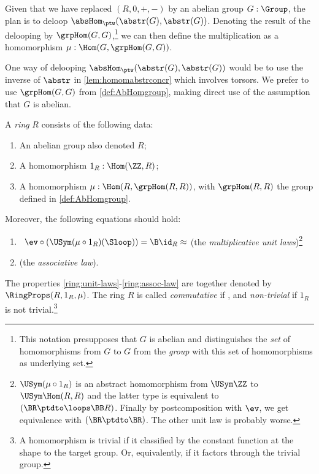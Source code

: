Given that we have replaced $(R,0,+,-)$ by an abelian group $G:\Group$,
the plan is to deloop $\absHom_{\ptw}(\abstr(G),\abstr(G))$. 
Denoting the result of the delooping by $\grpHom(G,G)$,\footnote{%
This notation presupposes that $G$ is abelian and distinguishes 
the \emph{set} of homomorphisms from $G$ to $G$ from the \emph{group}
with this set of homomorphisms as underlying set.}
we can then define the multiplication as a homomorphism
$\mu: \Hom(G,\grpHom(G,G))$.

One way of delooping $\absHom_{\ptw}(\abstr(G),\abstr(G))$ would be
to use the inverse of $\abstr$ in \cref{lem:homomabstrconcr}
which involves torsors.  
We prefer to use $\grpHom(G,G)$ from \cref{def:AbHomgroup},
making direct use of the assumption that $G$ is abelian.


\begin{definition}\label{def:ring}
A \emph{ring} $R$ consists of the following data:
\begin{enumerate}
\item An abelian group also denoted $R$;
\item A homomorphism $1_R:\Hom(\ZZ,R)$;
\item A homomorphism $\mu: \Hom(R,\grpHom(R,R))$, with $\grpHom(R,R)$
the group defined in \cref{def:AbHomgroup}.
\end{enumerate}
Moreover, the following equations should hold:
    \begin{enumerate}
    \item\label{ring:unit-laws}\
    $\ev\circ(\USym(\mu\circ{1_R})(\Sloop)) = \B\id_R \approx \MB{TBD}$ 
    (the \emph{multiplicative unit laws})\footnote{%
 $\USym(\mu\circ{1_R})$ is an abstract homomorphism
from $\USym\ZZ$ to $\USym\Hom(R,R)$ and the latter type
is equivalent to $(\BR\ptdto\loops\BB R)$. Finally by postcomposition
with $\ev$, we get equivalence with $(\BR\ptdto\BR)$.
The other unit law is probably worse.}
    \item\label{ring:assoc-law}  (the \emph{associative law}). %
    \end{enumerate}
The properties \ref{ring:unit-laws}-\ref{ring:assoc-law} 
are together denoted by $\RingProps(R,1_R,\mu)$.
The ring $R$ is called \emph{commutative} if , 
and \emph{non-trivial} if $1_R$ is not trivial.\footnote{%
A homomorphism is trivial if it classified by the constant function
at the shape to the target group. Or, equivalently, if it factors
through the trivial group.}
\end{definition}

